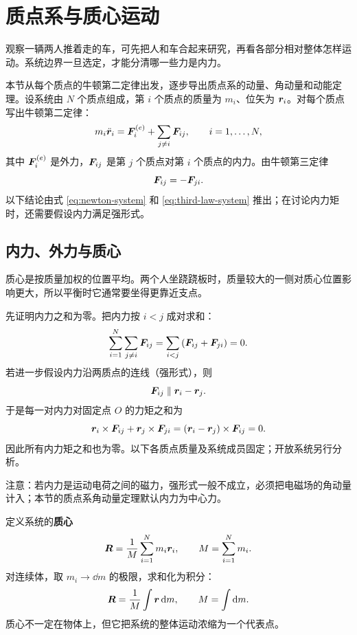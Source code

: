 \section{质点系与质心运动}

观察一辆两人推着走的车，可先把人和车合起来研究，再看各部分相对整体怎样运动。系统边界一旦选定，才能分清哪一些力是内力。

本节从每个质点的牛顿第二定律出发，逐步导出质点系的动量、角动量和动能定理。设系统由 $N$ 个质点组成，第 $i$ 个质点的质量为 $m_i$、位矢为 $\boldsymbol{r}_i$。对每个质点写出牛顿第二定律：
\begin{equation}
m_i\ddot{\boldsymbol{r}}_i=\boldsymbol{F}_i^{(e)}+\sum_{j\ne i}\boldsymbol{F}_{ij},
\qquad i=1,\dots,N,
\label{eq:newton-system}
\end{equation}
其中 $\boldsymbol{F}_i^{(e)}$ 是外力，$\boldsymbol{F}_{ij}$ 是第 $j$ 个质点对第 $i$ 个质点的内力。由牛顿第三定律
\begin{equation}
\boldsymbol{F}_{ij}=-\boldsymbol{F}_{ji}.
\label{eq:third-law-system}
\end{equation}
以下结论由式 \eqref{eq:newton-system} 和 \eqref{eq:third-law-system} 推出；在讨论内力矩时，还需要假设内力满足强形式。

\subsection{内力、外力与质心}

质心是按质量加权的位置平均。两个人坐跷跷板时，质量较大的一侧对质心位置影响更大，所以平衡时它通常要坐得更靠近支点。

先证明内力之和为零。把内力按 $i<j$ 成对求和：
\begin{equation}
\sum_{i=1}^{N}\sum_{j\ne i}\boldsymbol{F}_{ij}
=\sum_{i<j}\left(\boldsymbol{F}_{ij}+\boldsymbol{F}_{ji}\right)=0.
\label{eq:internal-force-zero}
\end{equation}
若进一步假设内力沿两质点的连线（强形式），则
\begin{equation}
\boldsymbol{F}_{ij}\parallel \boldsymbol{r}_i-\boldsymbol{r}_j .
\end{equation}
于是每一对内力对固定点 $O$ 的力矩之和为
\begin{equation}
\boldsymbol{r}_i\times\boldsymbol{F}_{ij}+\boldsymbol{r}_j\times\boldsymbol{F}_{ji}
=(\boldsymbol{r}_i-\boldsymbol{r}_j)\times\boldsymbol{F}_{ij}=0.
\label{eq:internal-torque-zero}
\end{equation}
因此所有内力矩之和也为零。以下各质点质量及系统成员固定；开放系统另行分析。

注意：若内力是运动电荷之间的磁力，强形式一般不成立，必须把电磁场的角动量计入；本节的质点系角动量定理默认内力为中心力。

定义系统的\textbf{质心}
\begin{equation}
\boldsymbol{R}=\frac{1}{M}\sum_{i=1}^{N}m_i\boldsymbol{r}_i,\qquad
M=\sum_{i=1}^{N}m_i .
\label{eq:cm-ch1}
\end{equation}
对连续体，取 $m_i\to\dd m$ 的极限，求和化为积分：
\begin{equation}
\boldsymbol{R}=\frac{1}{M}\int\boldsymbol{r}\,\mathrm{d} m,\qquad
M=\int\mathrm{d} m .
\end{equation}
质心不一定在物体上，但它把系统的整体运动浓缩为一个代表点。


